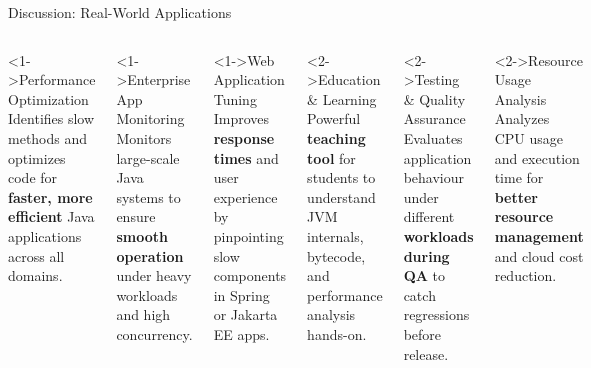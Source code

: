 \documentclass[aspectratio=169]{beamer}
\begin{document}
\begin{frame}{Discussion: Real-World Applications}
  \begin{columns}[T]
    
      \begin{block}<1->{Performance Optimization}
        \small Identifies slow methods and optimizes code for \textbf{faster, more
        efficient} Java applications across all domains.
      \end{block}
      
      \vspace{4pt}
      
      \begin{block}<1->{Enterprise App Monitoring}
        \small Monitors large-scale Java systems to ensure \textbf{smooth operation}
        under heavy workloads and high concurrency.
      \end{block}
      
      \vspace{4pt}
      
      \begin{block}<1->{Web Application Tuning}
        \small Improves \textbf{response times} and user experience by pinpointing
        slow components in Spring or Jakarta EE apps.
      \end{block}
    
    
      \begin{exampleblock}<2->{Education \& Learning}
        \small Powerful \textbf{teaching tool} for students to understand JVM
        internals, bytecode, and performance analysis hands-on.
      \end{exampleblock}
      
      \vspace{4pt}
      
      \begin{exampleblock}<2->{Testing \& Quality Assurance}
        \small Evaluates application behaviour under different \textbf{workloads during
        QA} to catch regressions before release.
      \end{exampleblock}
      
      \vspace{4pt}
      
      \begin{exampleblock}<2->{Resource Usage Analysis}
        \small Analyzes CPU usage and execution time for \textbf{better resource
        management} and cloud cost reduction.
      \end{exampleblock}

  \end{columns}
\end{frame}
\end{document}

